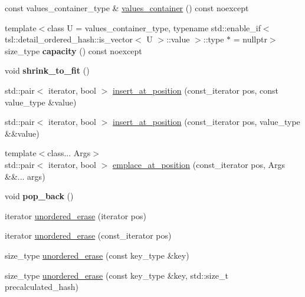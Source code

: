 \begin{DoxyCompactItemize}
\item 
const values\+\_\+container\+\_\+type \& \mbox{\hyperlink{classtsl_1_1ordered__set_a1bc951514a5c4c29c14b6cf5177cf1ec}{values\+\_\+container}} () const noexcept
\item 
\mbox{\label{classtsl_1_1ordered__set_a6182f68f6d191ba2c957daea2fbe32dc}} 
{\footnotesize template$<$class U  = values\+\_\+container\+\_\+type, typename std\+::enable\+\_\+if$<$ tsl\+::detail\+\_\+ordered\+\_\+hash\+::is\+\_\+vector$<$ U $>$\+::value $>$\+::type $\ast$  = nullptr$>$ }\\size\+\_\+type {\bfseries capacity} () const noexcept
\item 
\mbox{\label{classtsl_1_1ordered__set_ad3f1cb2ec551059e1316532205c461a7}} 
void {\bfseries shrink\+\_\+to\+\_\+fit} ()
\item 
std\+::pair$<$ iterator, bool $>$ \mbox{\hyperlink{classtsl_1_1ordered__set_af03dd4f519aaaa11716a3eb3a7132446}{insert\+\_\+at\+\_\+position}} (const\+\_\+iterator pos, const value\+\_\+type \&value)
\item 
std\+::pair$<$ iterator, bool $>$ \mbox{\hyperlink{classtsl_1_1ordered__set_aae9f958a17a59a693569a0519685fc0a}{insert\+\_\+at\+\_\+position}} (const\+\_\+iterator pos, value\+\_\+type \&\&value)
\item 
{\footnotesize template$<$class... Args$>$ }\\std\+::pair$<$ iterator, bool $>$ \mbox{\hyperlink{classtsl_1_1ordered__set_a227c222d9754fccd991600f109b86aea}{emplace\+\_\+at\+\_\+position}} (const\+\_\+iterator pos, Args \&\&... args)
\item 
\mbox{\label{classtsl_1_1ordered__set_ae440c07d0c3401bb8a1e672cda9d39d8}} 
void {\bfseries pop\+\_\+back} ()
\item 
iterator \mbox{\hyperlink{classtsl_1_1ordered__set_a96fc16543a99e892512b9119375c0fe5}{unordered\+\_\+erase}} (iterator pos)
\item 
iterator \mbox{\hyperlink{classtsl_1_1ordered__set_a4c0e19fd5e5e8832c522b6f876d2a7f9}{unordered\+\_\+erase}} (const\+\_\+iterator pos)
\item 
size\+\_\+type \mbox{\hyperlink{classtsl_1_1ordered__set_ae89a8c07da6b74f3dd737a77366d49cf}{unordered\+\_\+erase}} (const key\+\_\+type \&key)
\item 
size\+\_\+type \mbox{\hyperlink{classtsl_1_1ordered__set_a9b291ce4c12967996a10646ded0d352c}{unordered\+\_\+erase}} (const key\+\_\+type \&key, std\+::size\+\_\+t precalculated\+\_\+hash)

\end{DoxyCompactItemize}
